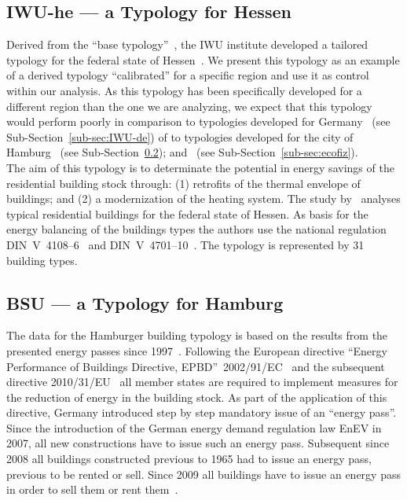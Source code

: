 \documentclass[authoryear,preprint,review,12pt]{elsarticle}
\begin{document}
\begin{linenumbers}


\subsection{IWU-he --- a Typology for Hessen}\label{sub-sec:IWU-he}

Derived from the ``base typology''~\cite{IWU.2003}, the IWU institute developed
a tailored typology for the federal state of
Hessen~\cite{Born.2003}.  We present this typology as an
example of a derived typology ``calibrated'' for a specific region and use it
as control within our analysis.  As this typology has been specifically
developed for a different region than the one we are analyzing, we expect that
this typology would perform poorly in comparison to typologies developed for
Germany~\cite{Loga.2012} (see Sub-Section~\ref{sub-sec:IWU-de}) of to
typologies developed for the city of Hamburg~\cite{BSU.2011} (see
Sub-Section~\ref{sub-sec:BSU}); and~\cite{Hermelink.2011} (see
Sub-Section~\ref{sub-sec:ecofiz}).\\

The aim of this typology is to determinate the potential in energy savings of
the residential building stock through:
(1) retrofits of the thermal envelope of buildings; and
(2) a modernization of the heating system\cite{Born.2003}.
The study by~\citeauthor{Born.2003} analyses typical
residential buildings for the federal state of Hessen.  As basis for
the energy balancing of the buildings types the authors use the national
regulation DIN~V~4108--6~\cite{DIN.4108-6} and
DIN~V~4701--10~\cite{DIN.4701-10}.  The typology is represented by 31
building types.\\



\subsection{BSU --- a Typology for Hamburg}\label{sub-sec:BSU}

The data for the Hamburger building typology is based on the results from the
presented energy passes since 1997~\cite{BSU.2011}.  Following the European
directive ``Energy Performance of Buildings Directive,
EPBD''~2002/91/EC~\cite{epbd.2002} and the subsequent directive
2010/31/EU~\cite{epbd.2010} all member states are required to implement
measures for the reduction of energy in the building stock.  As part of the
application of this directive, Germany introduced step by step mandatory issue
of an ``energy pass''. Since the introduction of the German energy demand
regulation law EnEV in 2007, all new constructions have to issue such an energy
pass.  Subsequent since 2008 all buildings constructed previous to 1965 had to
issue an energy pass, previous to be rented or sell.  Since 2009 all buildings
have to issue an energy pass in order to sell them or rent
them~\cite{BMVBS.2008}.\\


\end{linenumbers}
\end{document}
